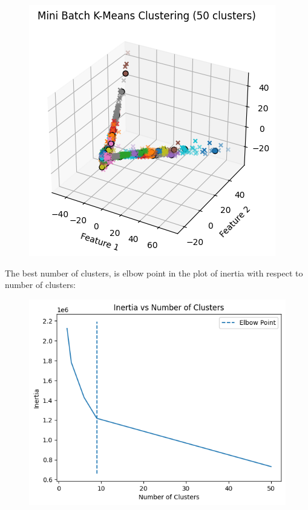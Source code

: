 \documentclass{template}
\begin{document}
\begin{figure}
\includegraphics[scale=0.7]{Clustering5.png}
\caption{}
\label{fig:logo}
\end{figure}
The best number of clusters, is elbow point in the plot of inertia with respect to number of clusters:
\begin{figure}
\includegraphics[scale=0.8]{Clustering6.png}
\caption{}
\label{fig:logo}
\end{figure}
\newpage
\end{document}
